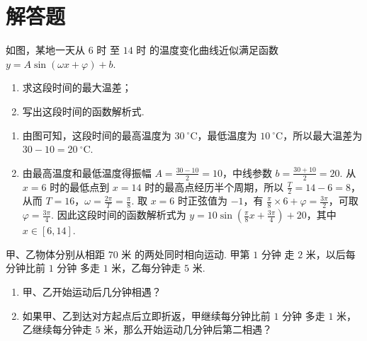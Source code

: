 \section{解答题}
\begin{problem}
如图，某地一天从 \(6\text{ 时}\) 至 \(14\text{ 时}\) 的温度变化曲线近似满足函数 \( y = A \sin(\omega x + \varphi) + b \).
\begin{enumerate}
\item 求这段时间的最大温差；
\item 写出这段时间的函数解析式.
\end{enumerate}

\FloatBarrier
\end{problem}

\begin{solution}
\begin{enumerate}
\item 由图可知，这段时间的最高温度为 \(30\mathrm{~^{\circ}C}\)，最低温度为 \(10\mathrm{~^{\circ}C}\)，所以最大温差为 \(30-10=20\mathrm{~^{\circ}C}\).
\item 由最高温度和最低温度得振幅 \(A=\frac{30-10}{2}=10\)，中线参数 \(b=\frac{30+10}{2}=20\). 从 \(x=6\) 时的最低点到 \(x=14\) 时的最高点经历半个周期，所以 \(\frac{T}{2}=14-6=8\)，从而 \(T=16\)，\(\omega=\frac{2\pi}{T}=\frac{\pi}{8}\). 取 \(x=6\) 时正弦值为 \(-1\)，有 \(\frac{\pi}{8}\times6+\varphi=\frac{3\pi}{2}\)，可取 \(\varphi=\frac{3\pi}{4}\). 因此这段时间的函数解析式为 \(y=10\sin\left(\frac{\pi}{8}x+\frac{3\pi}{4}\right)+20\)，其中 \(x\in[6,14]\).
\end{enumerate}
\end{solution}

\begin{problem}
甲、乙物体分别从相距 \(70\text{ 米}\) 的两处同时相向运动. 甲第 \(1\text{ 分钟}\) 走 \(2\text{ 米}\)，以后每分钟比前 \(1\text{ 分钟}\) 多走 \(1\text{ 米}\)，乙每分钟走 \(5\text{ 米}\).
\begin{enumerate}
\item 甲、乙开始运动后几分钟相遇？
\item 如果甲、乙到达对方起点后立即折返，甲继续每分钟比前 \(1\text{ 分钟}\) 多走 \(1\text{ 米}\)，乙继续每分钟走 \(5\text{ 米}\)，那么开始运动几分钟后第二相遇？
\end{enumerate}
\end{problem}

